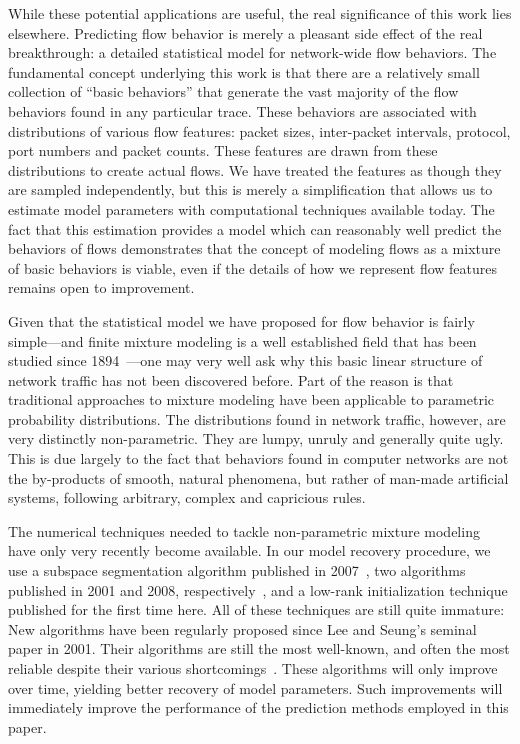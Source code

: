 \documentclass{acm_proc_article-sp}
\begin{document}
While these potential applications are useful, the real significance of this work lies elsewhere.
Predicting flow behavior is merely a pleasant side effect of the real breakthrough:
a detailed statistical model for network-wide flow behaviors.
The fundamental concept underlying this work is that there are a relatively small collection of ``basic behaviors'' that generate the vast majority of the flow behaviors found in any particular trace.
These behaviors are associated with distributions of various flow features:
packet sizes, inter-packet intervals,  protocol, port numbers and packet counts.
These features are drawn from these distributions to create actual flows.
We have treated the features as though they are sampled independently, but this is merely a simplification that allows us to estimate model parameters with computational techniques available today.
The fact that this estimation provides a model which can reasonably well predict the behaviors of flows demonstrates that the concept of modeling flows as a mixture of basic behaviors is viable, even if the details of how we represent flow features remains open to improvement.

Given that the statistical model we have proposed for flow behavior is fairly simple---and finite mixture modeling is a well established field that has been studied since 1894~\cite{McLachlan00}---one may very well ask why this basic linear structure of network traffic has not been discovered before.
Part of the reason is that traditional approaches to mixture modeling have been applicable to parametric probability distributions.
The distributions found in network traffic, however, are very distinctly non-parametric.
They are lumpy, unruly and generally quite ugly.
This is due largely to the fact that behaviors found in computer networks are not the by-products of smooth, natural phenomena, but rather of man-made artificial systems, following arbitrary, complex and capricious rules.

The numerical techniques needed to tackle non-parametric mixture modeling have only very recently become available.
In our model recovery procedure, we use a subspace segmentation algorithm published in 2007~\cite{Ma07}, two  algorithms published in 2001 and 2008, respectively~\cite{Lee01,Kim08:anls}, and a low-rank  initialization technique published for the first time here.
All of these techniques are still quite immature:
New  algorithms have been regularly proposed since Lee and Seung's seminal paper in 2001.
Their algorithms are still the most well-known, and often the most reliable despite their various shortcomings~\cite{Langville06}.
These algorithms will only improve over time, yielding better recovery of model parameters.
Such improvements will immediately improve the performance of the prediction methods employed in this paper.
\end{document}
